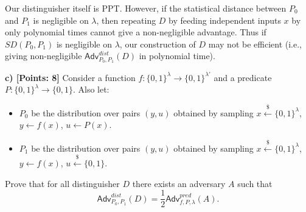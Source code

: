 \documentclass[12pt]{article}
\newcommand{\bits}{\{0,1\}}
\newcommand{\getsr}{\stackrel{\$}{\gets}}
\newcommand{\Adv}{\textsf{Adv}}
\theoremstyle{definition}
\begin{document}
Our distinguisher itself is PPT. However, if the statistical distance between $P_0$ and $P_1$ is negligible on $\lambda$, then repeating $D$ by feeding independent inputs $x$ by only polynomial times cannot give a non-negligible advantage. Thus if $SD(P_0,P_1)$ is negligible on $\lambda$, our construction of $D$ may not be efficient (i.e., giving non-negligible $\Adv_{P_0,P_1}^{dist}(D)$ in polynomial time).

{\bf c) [Points: 8]} Consider a function $f : \bits^\lambda \to \bits^{\lambda'}$ and a predicate $P : \bits^\lambda \to \bits$.
Also let:
\begin{itemize}
\item $P_0$ be the distribution over pairs $(y, u)$ obtained by sampling $x\getsr\bits^\lambda$, $y\gets f(x)$, $u\gets P(x)$.
\item $P_1$ be the distribution over pairs $(y, u)$ obtained by sampling $x\getsr\bits^\lambda$, $y\gets f(x)$, $u\getsr \bits$.
\end{itemize}
Prove that for all distinguisher $D$ there exists an adversary $A$ such that
$$\Adv_{P_0,P_1}^{dist}(D) = \frac{1}{2}\Adv_{f,P,\lambda}^{pred}(A).$$
\end{document}
